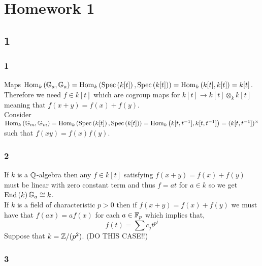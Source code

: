 \documentclass[12pt]{article}
\begin{document}
\section{Homework 1}

\subsection{1}

\subsubsection{1}

Maps $\mathrm{Hom}_{k} \left( \mathbb{G}_a, \mathbb{G}_a \right) = \mathrm{Hom}_{k} \left( \mathrm{Spec}\left( k[t] \right), \mathrm{Spec}\left( k[t] \right) \right) = \mathrm{Hom}_{k} \left( k[t], k[t] \right) = k[t]$. Therefore we need $f \in k[t]$ which are cogroup maps for $k[t] \to k[t] \otimes_k k[t]$ meaning that $f(x + y) = f(x) + f(y)$. 
\bigskip\\
Consider $\mathrm{Hom}_{k} \left( \mathbb{G}_m, \mathbb{G}_m \right) = \mathrm{Hom}_{k} \left( \mathrm{Spec}\left( k[t] \right), \mathrm{Spec}\left( k[t] \right) \right) = \mathrm{Hom}_{k} \left( k[t,t^{-1}], k[t,t^{-1}] \right) = (k[t, t^{-1}])^\times$ such that $f(xy) = f(x) f(y)$.

\subsubsection{2}

If $k$ is a $\mathbb{Q}$-algebra then any $f \in k[t]$ satisfying $f(x + y) = f(x) + f(y)$ must be linear with zero constant term and thus $f = a t$ for $a \in k$ so we get $\mathrm{End} \left( k \right){\mathbb{G}_a} \cong k$. 
\bigskip\\
If $k$ is a field of characteristic $p > 0$ then if $f(x+y) = f(x) + f(y)$ we must have that $f(ax) = a f(x)$ for each $a \in \mathbb{F}_p$ which implies that,
\[ f(t) = \sum c_j t^{p^j} \]
Suppose that $k = \mathbb{Z} / (p^2)$. (DO THIS CASE!!)

\subsubsection{3}
\end{document}
